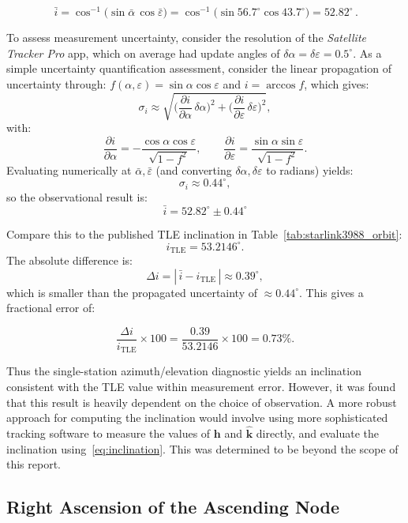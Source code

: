 \documentclass{article}
\begin{document}
\[
\,\bar{i} = \cos^{-1}\!\big(\sin\bar{\alpha}\,\cos\bar{\varepsilon}\big)
= \cos^{-1}\!\big(\sin 56.7^\circ\cos 43.7^\circ\big)
= 52.82^\circ\,.
\]

To assess measurement uncertainty, consider the resolution of the \textit{Satellite Tracker Pro} app, which on average had update angles of \(\delta\alpha=\delta\varepsilon=0.5^\circ\). As a simple uncertainty quantification assessment, consider the linear propagation of uncertainty through:
\(f(\alpha,\varepsilon)=\sin\alpha\cos\varepsilon\) and \(i=\arccos f\), which gives:
\[
\sigma_i \approx \sqrt{\Big(\frac{\partial i}{\partial\alpha}\,\delta\alpha\Big)^2 + \Big(\frac{\partial i}{\partial\varepsilon}\,\delta\varepsilon\Big)^2},
\]
with:
\[
\frac{\partial i}{\partial\alpha} = -\frac{\cos\alpha\cos\varepsilon}{\sqrt{1-f^2}},\qquad
\frac{\partial i}{\partial\varepsilon} = \frac{\sin\alpha\sin\varepsilon}{\sqrt{1-f^2}}.
\]
Evaluating numerically at \(\bar{\alpha},\bar{\varepsilon}\) (and converting \(\delta\alpha,\delta\varepsilon\) to radians) yields:
\[
\sigma_i \approx 0.44^\circ,
\]
so the observational result is:
\[
\boxed{\bar{i} = 52.82^\circ \pm 0.44^\circ}
\]

Compare this to the published TLE inclination in Table~\ref{tab:starlink3988_orbit}:
\[
i_{\mathrm{TLE}} = 53.2146^\circ.
\]
The absolute difference is:
\[
\Delta i = |\,\bar{i} - i_{\mathrm{TLE}}\,| \approx 0.39^\circ,
\]
which is smaller than the propagated uncertainty of \(\approx0.44^\circ\). This gives a fractional error of:

\[
\,
\frac{\Delta i}{i_{\mathrm{TLE}}} \times 100
= \frac{0.39}{53.2146} \times 100
= 0.73\%.
\,
\]

Thus the single-station azimuth/elevation diagnostic yields an inclination consistent with the TLE value within measurement error. However, it was found that this result is heavily dependent on the choice of observation. A more robust approach for computing the inclination would involve using more sophisticated tracking software to measure the values of $\mathbf{h}$ and $\hat{\mathbf{k}}$ directly, and evaluate the inclination using~\eqref{eq:inclination}. This was determined to be beyond the scope of this report.

\subsection{Right Ascension of the Ascending Node}
\end{document}
